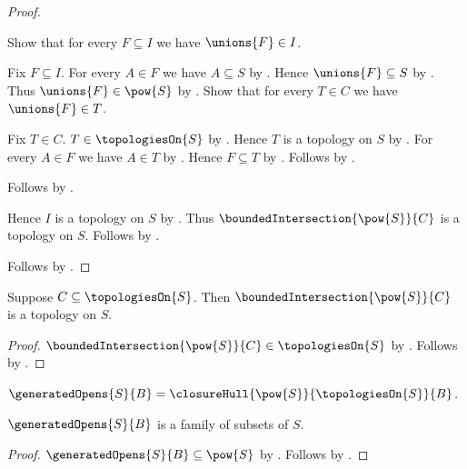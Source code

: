 \begin{proof}
\begin{subproof}
        Show that for every $F\subseteq I$ we have $\unions{F}\in I$.
        \begin{subproof}
            Fix $F\subseteq I$.
            For every $A\in F$ we have $A\subseteq S$ by
                .
            Hence $\unions{F}\subseteq S$ by .
            Thus $\unions{F}\in\pow{S}$ by .
            Show that for every $T\in C$ we have $\unions{F}\in T$.
            \begin{subproof}
                Fix $T\in C$.
                $T\in\topologiesOn{S}$ by .
                Hence $T$ is a topology on $S$ by
                    .
                For every $A\in F$ we have $A\in T$ by
                    .
                Hence $F\subseteq T$ by .
                Follows by .
            \end{subproof}
            Follows by .
        \end{subproof}
        Hence $I$ is a topology on $S$ by .
        Thus $\boundedIntersection{\pow{S}}{C}$ is a topology on $S$.
        Follows by .
    \end{subproof}
    Follows by .
\end{proof}

\begin{proposition}\label{bounded_intersection_of_topologies_is_topology}
    Suppose $C\subseteq\topologiesOn{S}$.
    Then $\boundedIntersection{\pow{S}}{C}$ is a topology on $S$.
\end{proposition}
\begin{proof}
    $\boundedIntersection{\pow{S}}{C}\in\topologiesOn{S}$ by
        .
    Follows by .
\end{proof}

\begin{definition}\label{generated_opens}
    $\generatedOpens{S}{B}
        =\closureHull{\pow{S}}{\topologiesOn{S}}{B}$.
\end{definition}

\begin{proposition}\label{generated_opens_type}
    $\generatedOpens{S}{B}$ is a family of subsets of $S$.
\end{proposition}
\begin{proof}
    $\generatedOpens{S}{B}\subseteq\pow{S}$ by
        .
    Follows by .
\end{proof}

